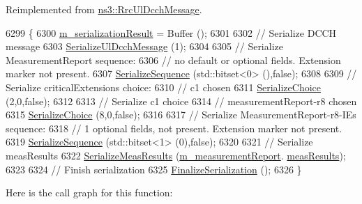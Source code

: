 Reimplemented from \hyperlink{classns3_1_1RrcUlDcchMessage_ad944dd076a13812009a03e54913b2e9b}{ns3\+::\+Rrc\+Ul\+Dcch\+Message}.


\begin{DoxyCode}
6299 \{
6300   \hyperlink{classns3_1_1Asn1Header_a758b74023ea5bf40941af6f0a6a66058}{m\_serializationResult} = Buffer ();
6301 
6302   \textcolor{comment}{// Serialize DCCH message}
6303   \hyperlink{classns3_1_1RrcUlDcchMessage_a7a2208192859678d93bde325f936c365}{SerializeUlDcchMessage} (1);
6304 
6305   \textcolor{comment}{// Serialize MeasurementReport sequence:}
6306   \textcolor{comment}{// no default or optional fields. Extension marker not present.}
6307   \hyperlink{classns3_1_1Asn1Header_aa9744858380443ed95836fed08799aed}{SerializeSequence} (std::bitset<0> (),\textcolor{keyword}{false});
6308 
6309   \textcolor{comment}{// Serialize criticalExtensions choice:}
6310   \textcolor{comment}{// c1 chosen}
6311   \hyperlink{classns3_1_1Asn1Header_a400ef4a710499da80fc55e23a973d4fa}{SerializeChoice} (2,0,\textcolor{keyword}{false});
6312 
6313   \textcolor{comment}{// Serialize c1 choice}
6314   \textcolor{comment}{// measurementReport-r8 chosen}
6315   \hyperlink{classns3_1_1Asn1Header_a400ef4a710499da80fc55e23a973d4fa}{SerializeChoice} (8,0,\textcolor{keyword}{false});
6316 
6317   \textcolor{comment}{// Serialize MeasurementReport-r8-IEs sequence:}
6318   \textcolor{comment}{// 1 optional fields, not present. Extension marker not present.}
6319   \hyperlink{classns3_1_1Asn1Header_aa9744858380443ed95836fed08799aed}{SerializeSequence} (std::bitset<1> (0),\textcolor{keyword}{false});
6320 
6321   \textcolor{comment}{// Serialize measResults}
6322   \hyperlink{classns3_1_1RrcAsn1Header_afd1285a96174a350f1d5c44c57ac8be9}{SerializeMeasResults} (\hyperlink{classns3_1_1MeasurementReportHeader_a7836c0f2ef3e219fc7ab0fee92e470f5}{m\_measurementReport}.
      \hyperlink{structns3_1_1LteRrcSap_1_1MeasurementReport_a84a65ffec25d719fdcba03fb28ca5b86}{measResults});
6323 
6324   \textcolor{comment}{// Finish serialization}
6325   \hyperlink{classns3_1_1Asn1Header_a6c9bfaa54e5ca1a4eb8ea6c6b5550a8b}{FinalizeSerialization} ();
6326 \}
\end{DoxyCode}


Here is the call graph for this function\+:


